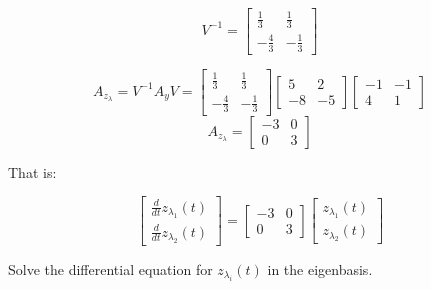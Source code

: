 \begin{enumerate}
{\[V^{-1}=\begin{bmatrix}\frac{1}{3} & \frac{1}{3} \\ -\frac{4}{3} & -\frac{1}{3}\end{bmatrix}\]

\[A_{z_\lambda} = V^{-1} A_y V = \begin{bmatrix}\frac{1}{3} & \frac{1}{3} \\ -\frac{4}{3} & -\frac{1}{3}\end{bmatrix}\begin{bmatrix}5 & 2 \\ -8 & -5\end{bmatrix}\begin{bmatrix} -1 & -1 \\ 4 & 1\end{bmatrix}\]
\[A_{z_\lambda} = \begin{bmatrix}-3 & 0 \\ 0 & 3\end{bmatrix}\]

That is:

	\[\begin{bmatrix}\frac{d}{dt}z_{\lambda_1}(t) \\ \frac{d}{dt}z_{\lambda_2}(t)\end{bmatrix} = \begin{bmatrix}-3 & 0 \\ 0 & 3\end{bmatrix}\begin{bmatrix}z_{\lambda_1}(t) \\ z_{\lambda_2}(t)\end{bmatrix}\]


}









\qitem Solve the differential equation for $z_{\lambda_i}(t)$ in the eigenbasis.

\end{enumerate}
